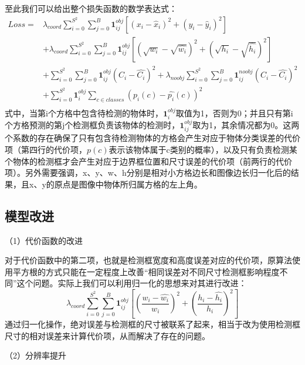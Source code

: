 至此我们可以给出整个损失函数的数学表达式：
\begin{equation} \label{eq:3_2_loss_function}
\begin{split}
Loss = & \lambda_{coord} \sum_{i=0}^{S^2}\sum_{j=0}^B \mathbf{1}_{ij}^{obj}
			\left[(x_i - \hat{x}_i)^2 + (y_i - \hat{y}_i)^2\right] \\
& + \lambda_{coord}  \sum_{i=0}^{S^2}\sum_{j=0}^B \mathbf{1}_{ij}^{obj}
			\left[ \left(\sqrt{w_i} - \sqrt{\hat{w_i}} \right) ^2 + \left( \sqrt{h_i} - \sqrt{\hat{h_i}} \right) ^2\right] \\
& + \sum_{i=0}^{S^2}\sum_{j=0}^B \mathbf{1}_{ij}^{obj} (C_i - \hat{C_i})^2
			+ \lambda_{noobj} \sum_{i=0}^{S^2}\sum_{j=0}^B \mathbf{1}_{ij}^{noobj} (C_i - \hat{C_i})^2 \\
& + \sum_{i=0}^{S^2} \mathbf{1}_{i}^{obj} \sum_{c \in classes} ( p_i(c) - \hat{p_i}(c) )^2 \\
\end{split}
\end{equation}
式中，当第i个方格中包含待检测的物体时，$\mathbf{1}_{i}^{obj}$取值为1，否则为0；并且只有第i个方格预测的第j个检测框负责该物体的检测时，$\mathbf{1}_{ij}^{obj}$取为1，其余情况都为0。这两个系数的存在确保了只有包含待检测物体的方格会产生对应于物体分类误差的代价项（第四行的代价项，$p(c)$表示该物体属于c类别的概率），以及只有负责检测某个物体的检测框才会产生对应于边界框位置和尺寸误差的代价项（前两行的代价项）。另外需要强调，x、y、w、h分别是相对小方格边长和图像边长归一化后的结果，且x、y的原点是图像中物体所归属方格的左上角。


\subsection{模型改进} %
（1）代价函数的改进

对于代价函数中的第二项，也就是检测框宽度和高度误差对应的代价项，原算法使用平方根的方式只能在一定程度上改善“相同误差对不同尺寸检测框影响程度不同”这个问题。实际上我们可以利用归一化的思想来对其进行改进：
\begin{equation}
\lambda_{coord}  \sum_{i=0}^{S^2}\sum_{j=0}^B \mathbf{1}_{ij}^{obj}
\left[ \left(\frac{w_i - \hat{w_i}}{w_i} \right) ^2 + \left( \frac{h_i - \hat{h_i}}{h_i} \right) ^2\right]
\end{equation}
通过归一化操作，绝对误差与检测框的尺寸被联系了起来，相当于改为使用检测框尺寸的相对误差来计算代价项，从而解决了存在的问题。

（2）分辨率提升 %


